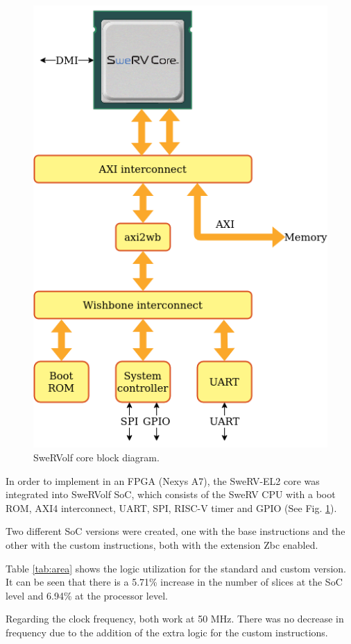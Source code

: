 \begin{figure}[b]
    \centering
    \includegraphics[width=0.7\linewidth]{img/swervolf.png}
    \caption{SweRVolf \cite{swervolf} core block diagram.}
    \label{fig:swervolf}
\end{figure}

In order to implement in an FPGA (Nexys A7), the SweRV-EL2 core was integrated into SweRVolf \cite{swervolf} SoC, 
which consists of the SweRV CPU with a boot ROM, AXI4 interconnect, UART, SPI, \mbox{RISC-V} timer and GPIO (See Fig. \ref{fig:swervolf}).

Two different SoC versions were created, one with the base instructions and the other with the custom instructions, 
both with the extension Zbc \cite{swervel2} enabled.

Table \ref{tab:area} shows the logic utilization for the standard and custom version. It can be seen that there is a 5.71\% increase in the 
number of slices at the SoC level and 6.94\% at the processor level.

Regarding the clock frequency, both work at 50 MHz. There was no decrease in frequency due to the addition of the extra logic for the
custom instructions.

